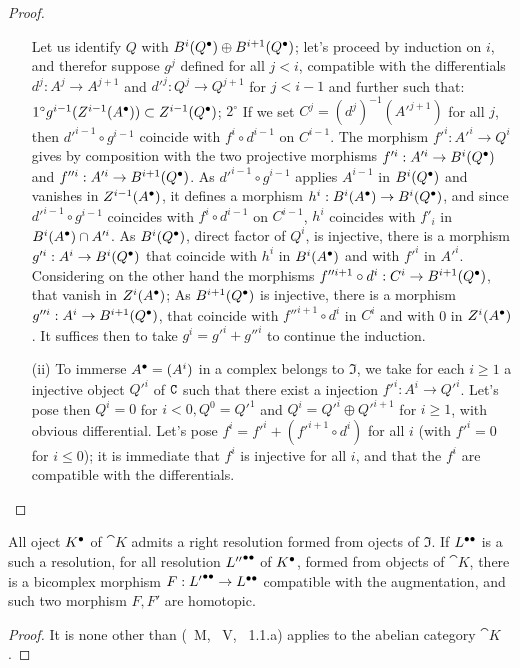 \begin{proof}
\begin{enumerate}
  Let us identify $Q$ with $B^i(\cx{Q})\oplus B^{i+1}(\cx{Q})$; let's proceed by induction on $i$, and therefor suppose 
  $g^j$ defined for all $j<i$, compatible with the differentials $d^j: A^j\rightarrow A^{j+1}$ and $d'^j: Q^j\rightarrow Q^{j+1}$ for $j<i-1$
  and further such that: $1^\circ g^{i-1}(Z^{i-1}(\cx{A}))\subset Z^{i-1}(\cx{Q})$; 
  $2^\circ$ If we set $C^j = (d^j)^{-1}(A'^{j+1})$ for all $j$, then $d'^{i-1}\circ g^{i-1}$ coincide with $f^i\circ d^{i-1}$ on $C^{i-1}$.
  The morphism $f'^i: A'^i\rightarrow Q^i$ gives by composition with the two projective morphisms $f'^i: A'^i\rightarrow B^i(\cx{Q})$ and $f''^i: A'^i\rightarrow B^{i+1}(\cx{Q})$.
  As $d'^{i-1}\circ g^{i-1}$ applies $A^{i-1}$ in $B^i(\cx{Q})$ and vanishes in $Z^{i-1}(\cx{A})$, it defines a morphism $h^i:B^i(\cx{A})\rightarrow B^i(\cx{Q})$,
  and since $d'^{i-1}\circ g^{i-1}$ coincides with $f^i\circ d^{i-1}$ on $C^{i-1}$, $h^i$ coincides with $f'_i$ in $B^i(\cx{A})\cap A'^i$.
  As $B^i(\cx{Q})$, direct factor of $Q^i$, is injective, there is a morphism $g'^i: A^i\rightarrow B^i(\cx{Q})$ that coincide with $h^i$ in $B^i(\cx{A})$ and with $f'^i$ in $A'^i$.
  Considering on the other hand the morphisms $f''^{i+1}\circ d^i: C^i\rightarrow B^{i+1}(\cx{Q})$, that vanish in $Z^i(\cx{A})$;
  As $B^{i+1}(\cx{Q})$ is injective, there is a morphism $g''^i: A^i\rightarrow B^{i+1}(\cx{Q})$, that coincide with $f''^{i+1}\circ d^i$ in $C^i$ and with 0 in $Z^i(\cx{A})$.
  It suffices then to take $g^i = g'^i + g''^i$ to continue the induction.
  \item[(ii)] To immerse ${A}^{\bullet} = (A^i)$ in a complex belongs to $\mathfrak{I}$, we take for each $i\geq 1$ a injective object $Q'^i$ of $\mathtt{C}$ such that there exist a injection $f'^i:A^i\rightarrow Q'^i$.
  Let's pose then $Q^i=0$ for $i<0, Q^0 = Q'^1$ and $Q^i=Q'^i\oplus Q'^{i+1}$ for $i\geq 1$, with obvious differential.
  Let's pose $f^i = f'^i + (f'^{i+1} \circ d^i)$ for all $i$ (with $f'^i = 0$ for $i\leq 0$);
  it is immediate that $f^i$ is injective for all $i$, and that the $f^i$ are compatible with the differentials.
\end{enumerate}
\end{proof}
  
\begin{corollary}[11.5.2.2]
\label{0.11.5.2.2}
All oject ${K}^{\bullet}$ of $\cat{K}$ admits a right resolution formed from ojects of $\mathfrak{I}$.
If ${L}^{\bullet\bullet}$ is a such a resolution, for all resolution ${L''}^{\bullet\bullet}$ of ${K}^{\bullet}$, formed from objects of $\cat{K}$,
there is a bicomplex morphism $F: {L'}^{\bullet\bullet}\rightarrow {L}^{\bullet\bullet}$ compatible with the augmentation, and such two morphism $F, F'$ are homotopic.

\begin{proof}
It is none other than (~M, ~V, ~1.1.a) applies to the abelian category $\cat{K}$.
\end{proof}
\end{corollary}
  
